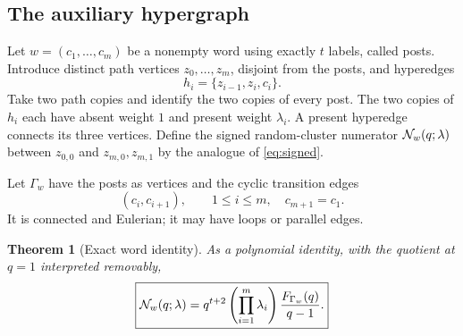 \documentclass[11pt,a4paper]{article}
\newtheorem{theorem}{Theorem}[section]
\theoremstyle{remark}\newtheorem{remark}[theorem]{Remark}
\begin{document}
\subsection{The auxiliary hypergraph}
Let $w=(c_1,\ldots,c_m)$ be a nonempty word using exactly $t$ labels, called posts. Introduce distinct path vertices $z_0,\ldots,z_m$, disjoint from the posts, and hyperedges
\[
h_i=\{z_{i-1},z_i,c_i\}.
\]
Take two path copies and identify the two copies of every post. The two copies of $h_i$ each have absent weight $1$ and present weight $\lambda_i$. A present hyperedge connects its three vertices. Define the signed random-cluster numerator $\mathcal N_w(q;\lambda)$ between $z_{0,0}$ and $z_{m,0},z_{m,1}$ by the analogue of \eqref{eq:signed}.

Let $\Gamma_w$ have the posts as vertices and the cyclic transition edges
\[
(c_i,c_{i+1}),\qquad 1\le i\le m,\quad c_{m+1}=c_1.
\]
It is connected and Eulerian; it may have loops or parallel edges.
\begin{theorem}[Exact word identity]\label{thm:word}
As a polynomial identity, with the quotient at $q=1$ interpreted removably,
\begin{equation}\label{eq:word}
\boxed{\displaystyle
\mathcal N_w(q;\lambda)=q^{t+2}\left(\prod_{i=1}^m\lambda_i\right)
\frac{F_{\Gamma_w}(q)}{q-1}.}
\end{equation}
\end{theorem}
\end{document}
